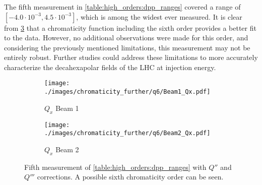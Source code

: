 \subsubsection{}

The fifth measurement in \cref{table:high_orders:dpp_ranges} covered a range of $[-4.0 \cdot
10^{-3}, 4.5 \cdot 10^{-3}]$, which is among the widest ever measured. It is clear from
\cref{fig:high_orders:chroma_after_correction_full_range} that a chromaticity function including the
sixth order provides a better fit to the data. However, no additional observations were made for
this order, and considering the previously mentioned limitations, this measurement may not be
entirely robust. Further studies could address these limitations to more accurately characterize the
decahexapolar fields of the LHC at injection energy.

\begin{figure}[!htb]
    \begin{subfigure}{0.49\textwidth}
        \centering
        \texttt{[image: ./images/chromaticity\_further/q6/Beam1\_Qx.pdf]}
        \caption{$Q_x$ Beam 1}
        \label{}
    \end{subfigure}
    \hfill
    \begin{subfigure}{0.49\textwidth}
        \centering
        \texttt{[image: ./images/chromaticity\_further/q6/Beam2\_Qx.pdf]}
        \caption{$Q_x$ Beam 2}
        \label{}
    \end{subfigure}
    \caption{Fifth measurement of \cref{table:high_orders:dpp_ranges} with $Q''$ and $Q'''$
    corrections. A possible sixth chromaticity order can be seen.}
    \label{fig:high_orders:chroma_after_correction_full_range}
\end{figure}


